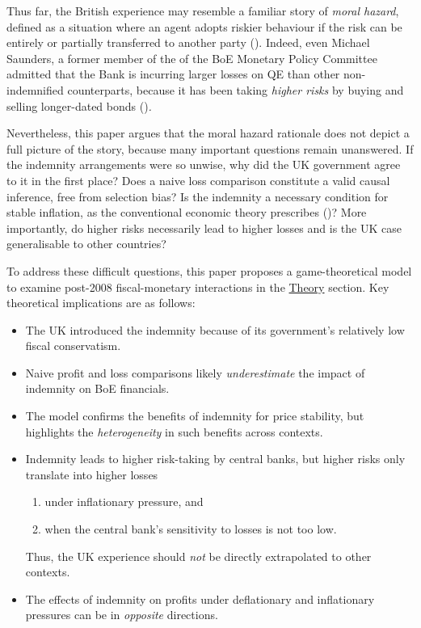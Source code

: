 \documentclass[
  a4paper,
  abstract=true]{scrartcl}
\theoremstyle{definition}
\begin{document}
Thus far, the British experience may resemble a familiar story of
\emph{moral hazard}, defined as a situation where an agent adopts
riskier behaviour if the risk can be entirely or partially transferred
to another party (). Indeed, even
Michael Saunders, a former member of the of the BoE Monetary Policy
Committee admitted that the Bank is incurring larger losses on QE than
other non-indemnified counterparts, because it has been taking
\emph{higher risks} by buying and selling longer-dated bonds
()\emph{.}

Nevertheless, this paper argues that the moral hazard rationale does not
depict a full picture of the story, because many important questions
remain unanswered. If the indemnity arrangements were so unwise, why did
the UK government agree to it in the first place? Does a naive loss
comparison constitute a valid causal inference, free from selection
bias? Is the indemnity a necessary condition for stable inflation, as
the conventional economic theory prescribes
()? More importantly, do
higher risks necessarily lead to higher losses and is the UK case
generalisable to other countries?

To address these difficult questions, this paper proposes a
game-theoretical model to examine post-2008 fiscal-monetary interactions
in the \hyperref[sec-theory]{Theory} section. Key theoretical
implications are as follows:

\begin{itemize}
\item
  The UK introduced the indemnity because of its government's relatively
  low fiscal conservatism.
\item
  Naive profit and loss comparisons likely \emph{underestimate} the
  impact of indemnity on BoE financials.
\item
  The model confirms the benefits of indemnity for price stability, but
  highlights the \emph{heterogeneity} in such benefits across contexts.
\item
  Indemnity leads to higher risk-taking by central banks, but higher
  risks only translate into higher losses

  \begin{enumerate}
  \def\labelenumi{\arabic{enumi}.}
  \item
    under inflationary pressure, and
  \item
    when the central bank's sensitivity to losses is not too low.
  \end{enumerate}

  Thus, the UK experience should \emph{not} be directly extrapolated to
  other contexts.
\item
  The effects of indemnity on profits under deflationary and
  inflationary pressures can be in \emph{opposite} directions.
\end{itemize}
\end{document}
